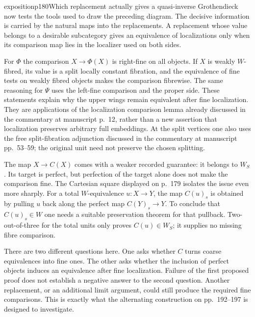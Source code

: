 \begin{dcomment}{exposition}{p180}{Which replacement actually gives a quasi-inverse}
Grothendieck now tests the tools used to draw the preceding diagram. The decisive information is carried by the natural maps into the replacements. A replacement whose value belongs to a desirable subcategory gives an equivalence of localizations only when its comparison map lies in the localizer used on both sides.

For $\Phi$ the comparison $X\to\Phi(X)$ is right-fine on all objects. If $X$ is weakly $W$-fibred, its value is a split locally constant fibration, and the equivalence of fine tests on weakly fibred objects makes the comparison fibrewise. The same reasoning for $\Psi$ uses the left-fine comparison and the proper side. These statements explain why the upper wings remain equivalent after fine localization. They are applications of the localization comparison lemma already discussed in the commentary at manuscript p.~12, rather than a new assertion that localization preserves arbitrary full embeddings. At the split vertices one also uses the free split-fibration adjunction discussed in the commentary at manuscript pp.~53--59; the original unit need not preserve the chosen splitting.

The map $X\to C(X)$ comes with a weaker recorded guarantee: it belongs to $W_S$. Its target is perfect, but perfection of the target alone does not make the comparison fine. The Cartesian square displayed on p.~179 isolates the issue even more sharply. For a total $W$-equivalence $u:X\to Y$, the map $C(u)_s$ is obtained by pulling $u$ back along the perfect map $C(Y)_s\to Y$. To conclude that $C(u)_s\in W$ one needs a suitable preservation theorem for that pullback. Two-out-of-three for the total units only proves $C(u)\in W_S$; it supplies no missing fibre comparison.

There are two different questions here. One asks whether $C$ turns coarse equivalences into fine ones. The other asks whether the inclusion of perfect objects induces an equivalence after fine localization. Failure of the first proposed proof does not establish a negative answer to the second question. Another replacement, or an additional limit argument, could still produce the required fine comparisons. This is exactly what the alternating construction on pp.~192--197 is designed to investigate.


\end{dcomment}
